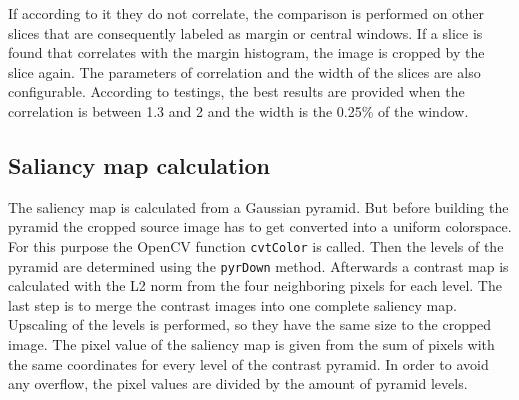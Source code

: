 \documentclass[draft,final]{vutinfth} %
\begin{document}
	If according to it they do not correlate, the comparison is performed on other slices that are consequently labeled as margin or central windows.
	If a slice is found that correlates with the margin histogram, the image is cropped by the slice again. 
	The parameters of correlation and the width of the slices are also configurable.
	According to testings, the best results are provided when the correlation is between 1.3 and 2 and the width is the 0.25\% of the window.
	
	\subsection{Saliancy map calculation}
	The saliency map is calculated from a Gaussian pyramid.
	But before building the pyramid the cropped source image has to get converted into a uniform colorspace.
	For this purpose the OpenCV function \texttt{cvtColor} is called.
	Then the levels of the pyramid are determined using the \texttt{pyrDown} method.
	Afterwards a contrast map is calculated with the L2 norm from the four neighboring pixels for each level.
	The last step is to merge the contrast images into one complete saliency map.
	Upscaling of the levels is performed, so they have the same size to the cropped image.
	The pixel value of the saliency map is given from the sum of pixels with the same coordinates for every level of the contrast pyramid. 
	In order to avoid any overflow, the pixel values are divided by the amount of pyramid levels.
	
\end{document}
